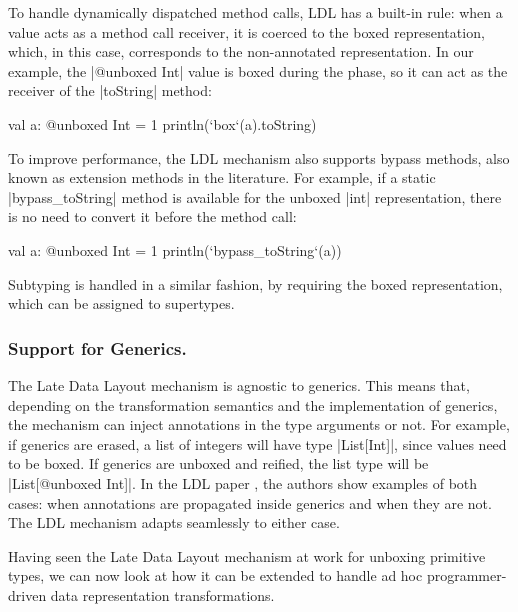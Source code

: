 To handle dynamically dispatched method calls, LDL has a built-in rule: when a value acts as a method call receiver, it is coerced to the boxed representation, which, in this case, corresponds to the non-annotated representation. In our example, the |@unboxed Int| value is boxed during the \coerce{} phase, so it can act as the receiver of the |toString| method:

\begin{lstlisting-nobreak}
val a: @unboxed Int = 1
println(`box`(a).toString)
\end{lstlisting-nobreak}

To improve performance, the LDL mechanism also supports bypass methods, also known as extension methods in the literature. For example, if a static |bypass_toString| method is available for the unboxed |int| representation, there is no need to convert it before the method call:

\begin{lstlisting-nobreak}
val a: @unboxed Int = 1
println(`bypass_toString`(a))
\end{lstlisting-nobreak}

Subtyping is handled in a similar fashion, by requiring the boxed representation, which can be assigned to supertypes.

\subsubsection{Support for Generics.} The Late Data Layout mechanism
is agnostic to generics. This means that, depending on the
transformation semantics and the implementation of generics, the
mechanism can inject annotations in the type arguments or not. For
example, if generics are erased, a list of integers will have type
|List[Int]|, since values need to be boxed. If generics are unboxed
and reified, the list type will be |List[@unboxed Int]|. In the LDL
paper \cite{ldl}, the authors show examples of both cases: when
annotations are propagated inside generics and when they are not. The
LDL mechanism adapts seamlessly to either case.

Having seen the Late Data Layout mechanism at work for unboxing primitive types, we can now look at how it can be extended to handle ad hoc programmer-driven data representation transformations.
